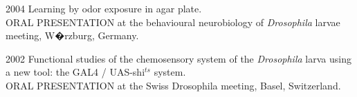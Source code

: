 \begin{itemize}
\begin{sloppypar}


\item[2004]
Learning by odor exposure in agar plate.
\\ORAL PRESENTATION at the
behavioural neurobiology of \textit{Drosophila} larvae meeting, W�rzburg,
Germany.


\item[2002]
Functional studies of the chemosensory system of the
\textit{Drosophila} larva  using a new tool: the GAL4 / UAS-shi$^{ts}$ system.
\\ORAL PRESENTATION at the Swiss Drosophila meeting, Basel, Switzerland.


\end{sloppypar}
\end{itemize}





